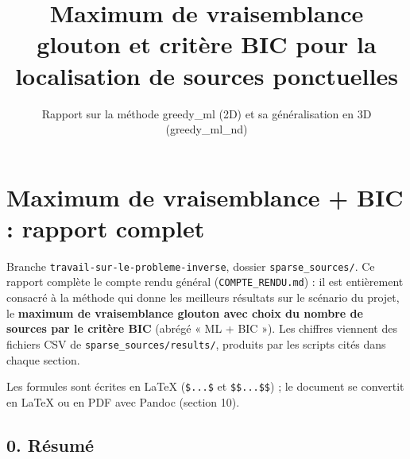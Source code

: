 \documentclass[
  french,
]{article}
\title{Maximum de vraisemblance glouton et critère BIC pour la
localisation de sources ponctuelles}
\subtitle{Rapport sur la méthode greedy\_ml (2D) et sa généralisation en
3D (greedy\_ml\_nd)}
\author{}
\date{}
\begin{document}
\maketitle

\section{Maximum de vraisemblance + BIC : rapport
complet}\label{maximum-de-vraisemblance-bic-rapport-complet}

Branche \texttt{travail-sur-le-probleme-inverse}, dossier
\texttt{sparse\_sources/}. Ce rapport complète le compte rendu général
(\texttt{COMPTE\_RENDU.md}) : il est entièrement consacré à la méthode
qui donne les meilleurs résultats sur le scénario du projet, le
\textbf{maximum de vraisemblance glouton avec choix du nombre de sources
par le critère BIC} (abrégé « ML + BIC »). Les chiffres viennent des
fichiers CSV de \texttt{sparse\_sources/results/}, produits par les
scripts cités dans chaque section.

Les formules sont écrites en LaTeX (\texttt{\$...\$} et
\texttt{\$\$...\$\$}) ; le document se convertit en LaTeX ou en PDF avec
Pandoc (section 10).

\subsection{0. Résumé}\label{ruxe9sumuxe9}
\end{document}
